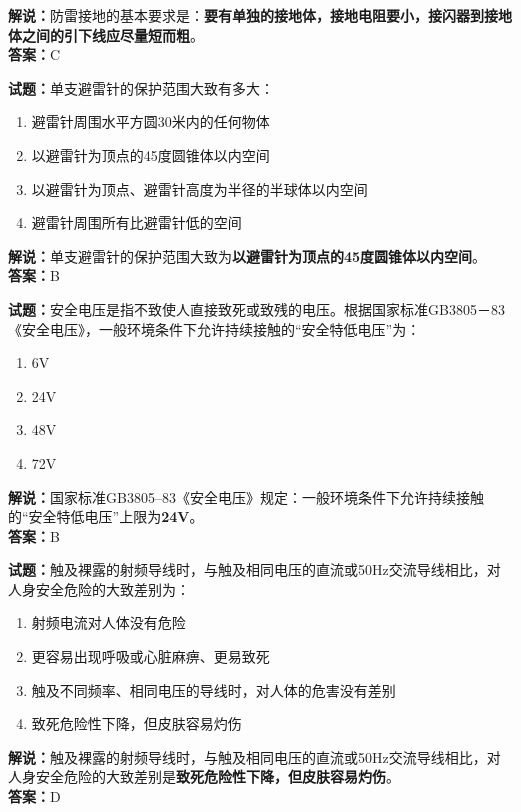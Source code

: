 \documentclass{ctexbook}
\begin{document}
\noindent\textbf{解说：}防雷接地的基本要求是：\textbf{要有单独的接地体，接地电阻要小，接闪器到接地体之间的引下线应尽量短而粗}。\\\noindent\textbf{答案：}C%

\vspace{\baselineskip}

\noindent\textbf{试题：}单支避雷针的保护范围大致有多大：

\begin{enumerate}[leftmargin=3em]
  \item 避雷针周围水平方圆30米内的任何物体
  \item 以避雷针为顶点的45度圆锥体以内空间
  \item 以避雷针为顶点、避雷针高度为半径的半球体以内空间
  \item 避雷针周围所有比避雷针低的空间
\end{enumerate}

\noindent\textbf{解说：}单支避雷针的保护范围大致为\textbf{以避雷针为顶点的45度圆锥体以内空间}。\\\noindent\textbf{答案：}B%

\vspace{\baselineskip}

\noindent\textbf{试题：}安全电压是指不致使人直接致死或致残的电压。根据国家标准GB3805－83《安全电压》，一般环境条件下允许持续接触的“安全特低电压”为：

\begin{enumerate}[leftmargin=3em]
  \item \num{6}V
  \item \num{24}V
  \item \num{48}V
  \item \num{72}V
\end{enumerate}

\noindent\textbf{解说：}国家标准GB3805--83《安全电压》规定：一般环境条件下允许持续接触的“安全特低电压”上限为\textbf{\num{24}V}。\\\noindent\textbf{答案：}B%

\vspace{\baselineskip}

\noindent\textbf{试题：}触及裸露的射频导线时，与触及相同电压的直流或50Hz交流导线相比，对人身安全危险的大致差别为：
\begin{enumerate}[leftmargin=3em]
  \item 射频电流对人体没有危险
  \item 更容易出现呼吸或心脏麻痹、更易致死
  \item 触及不同频率、相同电压的导线时，对人体的危害没有差别
  \item 致死危险性下降，但皮肤容易灼伤
\end{enumerate}
\noindent\textbf{解说：}触及裸露的射频导线时，与触及相同电压的直流或50Hz交流导线相比，对人身安全危险的大致差别是\textbf{致死危险性下降，但皮肤容易灼伤}。\\\noindent\textbf{答案：}D
\end{document}
